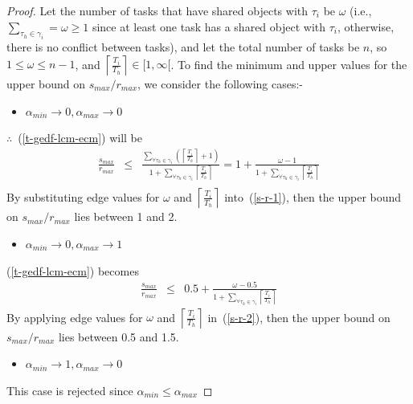 \documentclass[conference]{sig-alternate}
\begin{document}
\begin{proof}
Let the number of tasks that have shared objects with $\tau_i$ be $\omega$ (i.e., $\sum_{\tau_h \in \gamma_i}=\omega \ge 1$ since at least one task has a shared object with $\tau_i$, otherwise, there is no conflict between tasks), and let the total number of tasks be $n$, so $1\le \omega \le n-1$, and $\left\lceil\frac{T_i}{T_h}\right\rceil \in [1,\infty[$. To find the minimum and upper values for the upper bound on $s_{max}/r_{max}$, we consider the following cases:-
\begin{itemize}
\item $\alpha_{min} \rightarrow 0, \alpha_{max} \rightarrow 0$
\end{itemize}
$\therefore$~(\ref{t-gedf-lcm-ecm}) will be
\begin{eqnarray}
\frac{s_{max}}{r_{max}} & \le & \frac{{\sum_{\forall \tau_{h}\in\gamma_{i}}\left(\left\lceil\frac{T_{i}}{T_{h}}\right\rceil+1\right)}}{{1+\sum_{\forall \tau_{h}\in\gamma_{i}}\left\lceil\frac{T_{i}}{T_{h}}\right\rceil}}
 =  1+\frac{\omega-1}{1+\sum_{\forall \tau_h \in \gamma_i}\left\lceil\frac{T_i}{T_h}\right\rceil}\nonumber\\
\label{s-r-1}\end{eqnarray}
By substituting edge values for $\omega$ and $\left\lceil\frac{T_i}{T_h}\right\rceil$ into~(\ref{s-r-1}), then the upper bound on $s_{max}/r_{max}$ lies between 1 and 2.

\begin{itemize}
\item $\alpha_{min} \rightarrow 0, \alpha_{max} \rightarrow 1$
\end{itemize}
(\ref{t-gedf-lcm-ecm}) becomes
\begin{eqnarray}
\frac{s_{max}}{r_{max}} & \le & 0.5+ \frac{\omega - 0.5}{1+\sum_{\forall \tau_h \in \gamma_i}\left\lceil\frac{T_i}{T_h}\right\rceil}
\label{s-r-2}\end{eqnarray}
By applying edge values for $\omega$ and $\left\lceil\frac{T_i}{T_h}\right\rceil$ in~(\ref{s-r-2}), then the upper bound on $s_{max}/r_{max}$ lies between 0.5 and 1.5.

\begin{itemize}
\item $\alpha_{min} \rightarrow 1, \alpha_{max} \rightarrow 0$
\end{itemize}
This case is rejected since $\alpha_{min} \le \alpha_{max}$


\end{proof}
\end{document}
